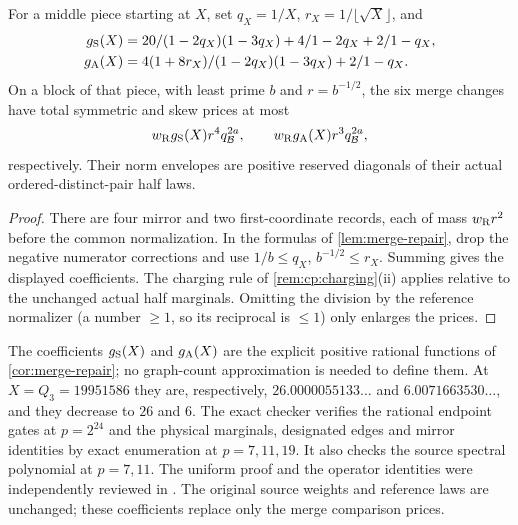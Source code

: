 \begin{corollary}\label{cor:merge-repair}
For a middle piece starting at $X$, set $q_X=1/X$,
$r_X=1/\lfloor\sqrt X\rfloor$, and
\begin{align*}
 g_{\rm S}(X)&=\frac{20}{(1-2q_X)(1-3q_X)}
                  +\frac4{1-2q_X}+\frac2{1-q_X},\\
 g_{\rm A}(X)&=\frac{4(1+8r_X)}{(1-2q_X)(1-3q_X)}
                  +\frac2{1-q_X}.
\end{align*}
On a block of that piece, with least prime $b$ and $r=b^{-1/2}$, the six
merge changes have total symmetric and skew prices at most
\[
 w_{\rm R}g_{\rm S}(X)r^4q_\Blk^{2a},\qquad
 w_{\rm R}g_{\rm A}(X)r^3q_\Blk^{2a},
\]
respectively. Their norm envelopes are positive reserved diagonals of
their actual ordered-distinct-pair half laws.
\end{corollary}

\begin{proof}
There are four mirror and two first-coordinate records, each of mass
$w_{\rm R}r^2$ before the common normalization. In the formulas of
\cref{lem:merge-repair}, drop the negative numerator corrections and
use $1/b\le q_X$, $b^{-1/2}\le r_X$. Summing gives the displayed
coefficients. The charging rule of \cref{rem:cp:charging}(ii) applies
relative to the unchanged actual half marginals. Omitting the
division by the reference normalizer (a number $\ge1$, so its
reciprocal is $\le1$) only enlarges the prices.
\end{proof}

\begin{certificate}\label{cert:merge-coefficients}
The coefficients $g_{\rm S}(X)$ and $g_{\rm A}(X)$ are the explicit positive
rational functions of \cref{cor:merge-repair}; no graph-count approximation
is needed to define them. At $X=Q_3=19951586$ they are, respectively,
$26.0000055133\ldots$ and $6.0071663530\ldots$, and they decrease to $26$
and $6$. The exact checker
verifies the rational endpoint gates at $p=2^{24}$ and the physical
marginals, designated edges and mirror identities by exact enumeration
at $p=7,11,19$. It also checks the source spectral polynomial at $p=7,11$.
The uniform proof and the operator identities were independently reviewed
in .
The original source weights and reference laws are unchanged; these
coefficients replace only the merge comparison prices.
\end{certificate}

